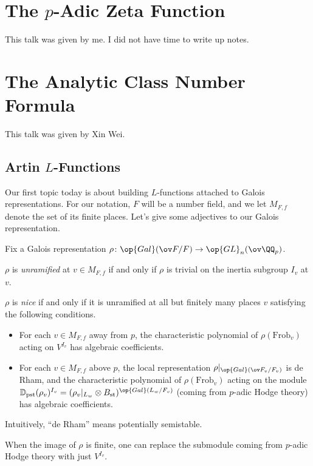 \documentclass{article}
\begin{document}
\section{The \texorpdfstring{$p$}{p}-Adic Zeta Function}
This talk was given by me. I did not have time to write up notes.

\section{The Analytic Class Number Formula}
This talk was given by Xin Wei.

\subsection{Artin \texorpdfstring{$L$}{L}-Functions}
Our first topic today is about building $L$-functions attached to Galois representations. For our notation, $F$ will be a number field, and we let $M_{F,f}$ denote the set of its finite places. Let's give some adjectives to our Galois representation.
\begin{definition}
	Fix a Galois representation $\rho\colon\op{Gal}(\ov F/F)\to\op{GL}_n(\ov\QQ_p)$.
	\begin{listalph}
		\item $\rho$ is \textit{unramified} at $v\in M_{F,f}$ if and only if $\rho$ is trivial on the inertia subgroup $I_v$ at $v$.
		\item $\rho$ is \textit{nice} if and only if it is unramified at all but finitely many places $v$ satisfying the following conditions.
		\begin{itemize}
			\item For each $v\in M_{F,f}$ away from $p$, the characteristic polynomial of $\rho(\mathrm{Frob}_v)$ acting on $V^{I_v}$ has algebraic coefficients.
			\item For each $v\in M_{F,f}$ above $p$, the local representation $\rho|_{\op{Gal}(\ov F_v/F_v)}$ is de Rham, and the characteristic polynomial of $\rho(\mathrm{Frob}_v)$ acting on the module $\mathbb D_{\mathrm{pst}}(\rho_v)^{I_v}=(\rho_v|_{L_w}\otimes B_{\mathrm{st}})^{\op{Gal}(L_w/F_v)}$ (coming from $p$-adic Hodge theory) has algebraic coefficients.
		\end{itemize}
	\end{listalph}
\end{definition}
\begin{remark}
	Intuitively, ``de Rham'' means potentially semistable.
\end{remark}
\begin{remark}
	When the image of $\rho$ is finite, one can replace the submodule coming from $p$-adic Hodge theory with just $V^{I_v}$.
\end{remark}
\end{document}
